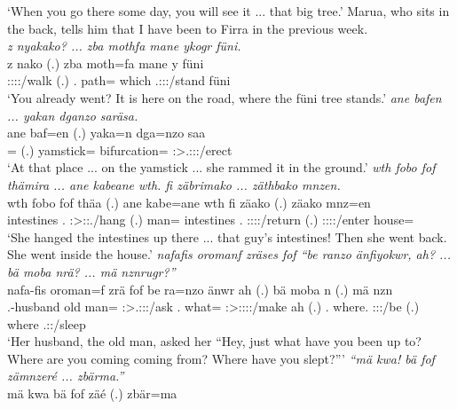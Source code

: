 \begin{exe}
	\trans `When you go there some day, you will see it ... that big tree.'
	{\footnotesize{Marua, who sits in the back, tells him that I have been to Firra in the previous week.}}\\
	\emph{z nyakako? ... zba mothfa mane ykogr füni.}\\
	\gll z nako (.) zba moth=fa mane y füni\\
	\Iam{} \Ssg:\Sbj:\Pst:\Ipfv:\Andat/walk (.) \Prox.\Abl{} path=\Abl{} which \Tsg.\Masc:\Sbj:\Nonpast:\Stat/stand füni\\
	\trans `You already went? It is here on the road, where the füni tree stands.'
	\emph{ane bafen ... yakan dganzo saräsa.}\\
	\gll ane baf=en (.) yaka=n dga=nzo saa\\
	\Dem{} \Recog=\Loc{} (.) yamstick=\Loc{} bifurcation=\Only{} \Sg:\Sbj>\Tsg.\Masc:\Obj:\Pst:\Pfv/erect\\
	\trans `At that place ... on the yamstick ... she rammed it in the ground.'
	\emph{wth fobo fof thämira ... ane kabeane wth. fi zäbrimako ... zäthbako mnzen.}\\
	\gll wth fobo fof thäa (.) ane kabe=ane wth fi zäako (.) zäako mnz=en\\
	intestines \Dist.\All{} \Emph{} \Sg:\Sbj>\Stpl:\Obj:\Pst.\Pfv/hang (.) \Dem{} man=\Poss{} intestines \Third.\Abs{} \Sg:\Sbj:\Pst:\Pfv:\Andat/return (.) \Sg:\Sbj:\Pst:\Pfv:\Andat/enter house=\Loc\\
	\trans `She hanged the intestines up there ... that guy's intestines! Then she went back. She went inside the house.'
	\emph{nafafis oromanf zräses fof ``be ranzo änfiyokwr, ah? ... bä moba nrä? ... mä nznrugr?''}\\
	\gll nafa-fis oroman=f zrä fof be ra=nzo änwr ah (.) bä moba n (.) mä nzn\\
	\Third.\Poss-husband {old man}=\Erg{} \Stsg:\Sbj>\Tsg.\F:\Obj:\Irr:\Pfv/ask \Emph{} \Ssg.\Erg{} what=\Only{} \Stsg:\Sbj>\Stpl:\Obj:\Nonpast:\Ipfv:\Venit/make ah (.) \Second.\Abs{} where.\Abl{} \Ssg:\Sbj:\Nonpast:\Ipfv/be (.) where \Ssg.\Sbj:\Rpst:\Ipfv/sleep\\
	\trans `Her husband, the old man, asked her ``Hey, just what have you been up to? Where are you coming coming from? Where have you slept?'''
	\emph{``mä kwa! bä fof zämnzeré ... zbärma.''}\\
	\gll mä kwa bä fof zäé (.) zbär=ma\\

\end{exe}
